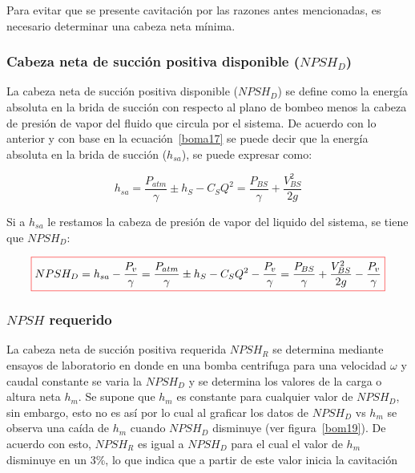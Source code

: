 \documentclass[11pt, oneside]{article}
\begin{document}
Para evitar que se presente cavitaci\'on por las razones antes mencionadas, es necesario determinar una cabeza neta m\'inima.

\subsubsection*{Cabeza neta de succi\'on positiva disponible ($NPSH_D$)}
La cabeza neta de succi\'on positiva disponible ($NPSH_D$) se define como la energ\'ia absoluta en la brida de succi\'on con respecto al plano de bombeo menos la cabeza de presi\'on de vapor del fluido que circula por el sistema. De acuerdo con lo anterior y con base en la ecuaci\'on~\ref{boma17} se puede decir que la energ\'ia absoluta en la brida de succi\'on ($h_{sa}$), se puede expresar como:

\begin{equation}
h_{sa} = \frac{P_{atm}}{\gamma} \pm h_S - C_S Q^2 = \frac{P_{BS}}{\gamma} + \frac{V_{BS}^2}{2g} 
\label{boma19}
\end{equation}

Si a $h_{sa}$ le restamos la cabeza de presi\'on de vapor del liquido del sistema, se tiene que $NPSH_D$:

\begin{equation}
\color{red}\boxed{\color{black} NPSH_D = h_{sa} -\frac{P_v}{\gamma} = \frac{P_{atm}}{\gamma} \pm h_S - C_S Q^2 -\frac{P_v}{\gamma} = \frac{P_{BS}}{\gamma} + \frac{V_{BS}^2}{2g} -\frac{P_v}{\gamma}}
\label{boma19}
\end{equation}


\subsubsection*{$NPSH$ requerido}
La cabeza neta de succi\'on positiva requerida  $NPSH_R$ se determina mediante ensayos de laboratorio en donde en una bomba centrifuga para una velocidad $\omega$ y caudal constante se varia la $NPSH_D$ y se determina los valores de la carga o altura neta $h_m$. Se supone que $h_m$ es constante para cualquier valor de $NPSH_D$, sin embargo, esto no es as\'i por lo cual al graficar los datos de $NPSH_D$ vs $h_m$ se observa una ca\'ida de $h_m$ cuando $NPSH_D$ disminuye (ver figura~\ref{bom19}). De acuerdo con esto, $NPSH_R$ es igual a $NPSH_D$ para el cual el valor de $h_m$ disminuye en un 3\%, lo que indica que a partir de este valor inicia la cavitaci\'on
\end{document}
